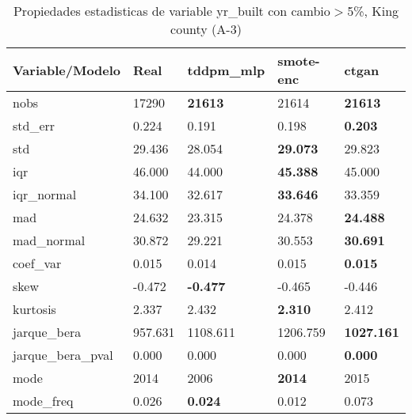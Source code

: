 \begin{table}[H]
\centering
\fontsize{8}{14}\selectfont
\caption{Propiedades estadisticas de variable yr\_built con cambio\ensuremath{>}5\%, King county (A-3)}
\label{table-stats-king county-a-3-yr_built-short}
\begin{tabular}{|l|m{10em}|m{10em}|m{10em}|m{10em}|}
\hline
 \rowcolor[gray]{0.8}
Variable/Modelo & Real & tddpm\_mlp & smote-enc & ctgan \\
\hline nobs & 17290 & \bfseries 21613 & \cellcolor[rgb]{0.9, 0.54, 0.52} 21614 & \bfseries 21613 \\
\hline std\_err & 0.224 & \cellcolor[rgb]{0.9, 0.54, 0.52} 0.191 & 0.198 & \bfseries 0.203 \\
\hline std & 29.436 & \cellcolor[rgb]{0.9, 0.54, 0.52} 28.054 & \bfseries 29.073 & 29.823 \\
\hline iqr & 46.000 & \cellcolor[rgb]{0.9, 0.54, 0.52} 44.000 & \bfseries 45.388 & 45.000 \\
\hline iqr\_normal & 34.100 & \cellcolor[rgb]{0.9, 0.54, 0.52} 32.617 & \bfseries 33.646 & 33.359 \\
\hline mad & 24.632 & \cellcolor[rgb]{0.9, 0.54, 0.52} 23.315 & 24.378 & \bfseries 24.488 \\
\hline mad\_normal & 30.872 & \cellcolor[rgb]{0.9, 0.54, 0.52} 29.221 & 30.553 & \bfseries 30.691 \\
\hline coef\_var & 0.015 & \cellcolor[rgb]{0.9, 0.54, 0.52} 0.014 & 0.015 & \bfseries 0.015 \\
\hline skew & -0.472 & \bfseries -0.477 & -0.465 & \cellcolor[rgb]{0.9, 0.54, 0.52} -0.446 \\
\hline kurtosis & 2.337 & \cellcolor[rgb]{0.9, 0.54, 0.52} 2.432 & \bfseries 2.310 & 2.412 \\
\hline jarque\_bera & 957.631 & 1108.611 & \cellcolor[rgb]{0.9, 0.54, 0.52} 1206.759 & \bfseries 1027.161 \\
\hline jarque\_bera\_pval & 0.000 & \cellcolor[rgb]{0.9, 0.54, 0.52} 0.000 & \cellcolor[rgb]{0.9, 0.54, 0.52} 0.000 & \bfseries 0.000 \\
\hline mode & 2014 & \cellcolor[rgb]{0.9, 0.54, 0.52} 2006 & \bfseries 2014 & 2015 \\
\hline mode\_freq & 0.026 & \bfseries 0.024 & 0.012 & \cellcolor[rgb]{0.9, 0.54, 0.52} 0.073 \\
\hline
\end{tabular}
\end{table}
